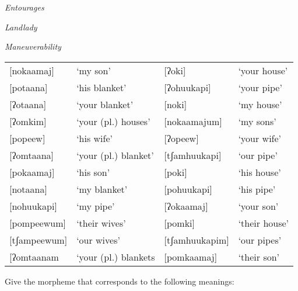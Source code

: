 \documentclass[addpoints]{exam}
\begin{document}
\begin{questions}
        \question[2] \emph{Entourages}

        \vspace{3cm}

        \question[2] \emph{Landlady}

        \vspace{3cm}

        \question[2] \emph{Maneuverability}

        \vspace{3cm}



        \begin{tabular}{l l l l}
          {[}nokaamaj]    & `my son'              & [ʔoki]          & `your house' \\
          {[}potaana]     & `his blanket'         & [ʔohuukapi]     & `your pipe' \\
          {[}ʔotaana]     & `your blanket'        & [noki]          & `my house' \\
          {[}ʔomkim]      & `your (pl.) houses'   & [nokaamajum]    & `my sons' \\
          {[}popeew]      & `his wife'            & [ʔopeew]        & `your wife' \\
          {[}ʔomtaana]    & `your (pl.) blanket'  & [tʃamhuukapi]   & `our pipe' \\
          {[}pokaamaj]    & `his son'             & [poki]          & `his house' \\
          {[}notaana]     & `my blanket'          & [pohuukapi]     & `his pipe' \\
          {[}nohuukapi]   & `my pipe'             & [ʔokaamaj]      & `your son' \\
          {[}pompeewum]   & `their wives'         & [pomki]         & `their house' \\
          {[}tʃampeewum]  & `our wives'           & [tʃamhuukapim]  & `our pipes' \\
          {[}ʔomtaanam    & `your (pl.) blankets  & [pomkaamaj]     & `their son'

        \end{tabular}

        \question Give the morpheme that corresponds to the following meanings:
\end{questions}
\end{document}
